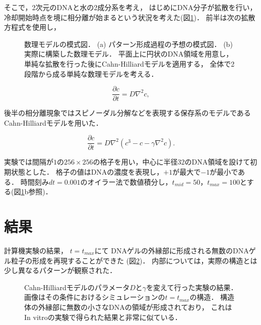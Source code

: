 そこで，2次元のDNAと水の2成分系を考え，
はじめにDNA分子が拡散を行い，
冷却開始時点を境に相分離が始まるという状況を考えた(図\ref{fig:model_cahn_hilliard})．
前半は次の拡散方程式を使用し，

\begin{figure}
\centering

\caption{
    数理モデルの模式図．
    (a) パターン形成過程の予想の模式図．
    (b) 実際に構築した数理モデル．
        平面上に円状のDNA領域を用意し，
        単純な拡散を行った後にCahn-Hilliardモデルを適用する，
        全体で2段階から成る単純な数理モデルを考える．
}
\label{fig:model_cahn_hilliard}
\end{figure}

\begin{equation}
\frac{\partial c}{\partial t}
=
D \nabla^{2} c
,
\end{equation}

後半の相分離現象ではスピノーダル分解などを表現する保存系のモデルであるCahn-Hilliardモデルを用いた．

\begin{equation}
\frac{\partial c}{\partial t}
=
D \nabla^{2} \left( c^3 - c - \gamma \nabla^{2} c \right)
.
\end{equation}

実験では間隔が$1$の$256\times 256$の格子を用い，中心に半径32のDNA領域を設けて初期状態とした．
格子の値はDNAの濃度を表現し，$+1$が最大で$-1$が最小である．
時間刻み$dt=0.001$のオイラー法で数値積分し，$t_{mid}=50$，$t_{max}=100$とする(図\ref{fig:model_cahn_hilliard}b参照)．

\section{結果}

計算機実験の結果，
$t=t_{max}$にて
DNAゲルの外縁部に形成される無数のDNAゲル粒子の形成を再現することができた
(図\ref{fig:result_cahn_hilliard})．
内部については，実際の構造とは少し異なるパターンが観察された．

\begin{figure}
\centering

\caption{
    Cahn-Hilliardモデルのパラメータ$D$と$\gamma$を変えて行った実験の結果．
    画像はその条件におけるシミュレーションの$t=t_{max}$の構造．
    構造体の外縁部に無数の小さなDNAの領域が形成されており，
    これはIn vitroの実験で得られた結果と非常に似ている．
}
\label{fig:result_cahn_hilliard}
\end{figure}


